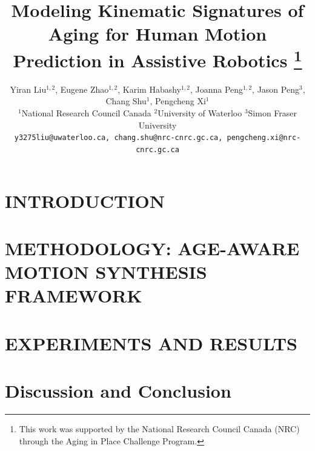 \documentclass[letterpaper, 10 pt, conference]{ieeeconf}  %
\title{\LARGE \bf
Modeling Kinematic Signatures of Aging for Human Motion Prediction in Assistive Robotics%
\thanks{This work was supported by the National Research Council Canada (NRC) through the Aging in Place Challenge Program.}
}
\author{
Yiran Liu$^{1,2}$, Eugene Zhao$^{1,2}$, Karim Habashy$^{1,2}$, Joanna Peng$^{1,2}$, Jason Peng$^{3}$, Chang Shu$^{1}$, Pengcheng Xi$^{1}$ \\
$^{1}$National Research Council Canada \quad
$^{2}$University of Waterloo \quad
$^{3}$Simon Fraser University \\
{\tt\small y3275liu@uwaterloo.ca, chang.shu@nrc-cnrc.gc.ca, pengcheng.xi@nrc-cnrc.gc.ca}
}
\begin{document}
\maketitle

\begin{abstract}

\end{abstract}

\section{INTRODUCTION}




\section{METHODOLOGY: AGE-AWARE MOTION SYNTHESIS FRAMEWORK}
\label{sec:method}



\section{EXPERIMENTS AND RESULTS}




\section{Discussion and Conclusion}





\clearpage



\end{document}
